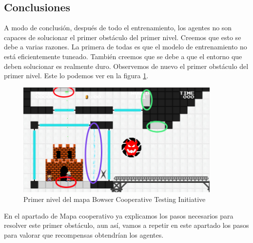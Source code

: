 \subsection*{Conclusiones}

A modo de conclusión, después de todo el entrenamiento, los agentes no son capaces de solucionar el primer obstáculo del primer nivel. Creemos que esto se debe a varias razones. La primera de todas es que el modelo de entrenamiento no está eficientemente tuneado. También creemos que se debe a que el entorno que deben solucionar es realmente duro. Observemos de nuevo el primer obstáculo del primer nivel. Este lo podemos ver en la figura \ref{fig:mapa-duro}.

\begin{figure}[ht]
    \centering
    \includegraphics[width=0.9\textwidth]{img/mario-1-level.png}
    \caption{Primer nivel del mapa Bowser Cooperative Testing Initiative \cite {mari0-mapa}}
    \label{fig:mapa-duro}
\end{figure}

En el apartado de Mapa cooperativo ya explicamos los pasos necesarios para resolver este primer obstáculo, aun así, vamos a repetir en este apartado los pasos para valorar que recompensas obtendrían los agentes.

